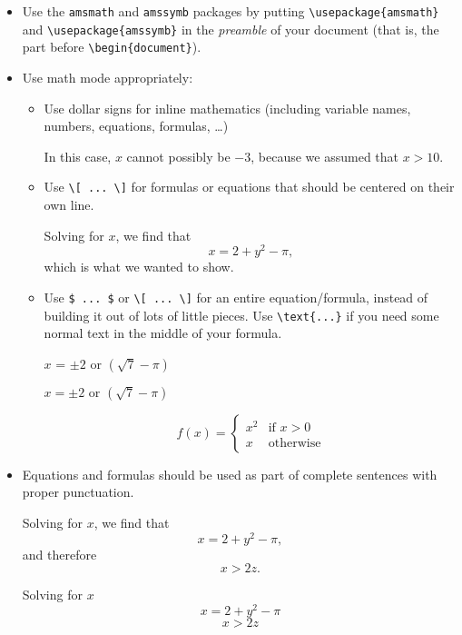 \documentclass{article}
\begin{document}
\begin{itemize}
\item Use the \texttt{amsmath} and \texttt{amssymb} packages by
  putting \verb|\usepackage{amsmath}| and \verb|\usepackage{amssymb}|
  in the \emph{preamble} of your document (that is, the part before
  \verb|\begin{document}|).
\item Use math mode appropriately:
  \begin{itemize}
  \item Use dollar signs for inline mathematics (including variable
    names, numbers, equations, formulas, \dots)
    \begin{good}
In this case, $x$ cannot possibly be $-3$, because we assumed that $x > 10$.
    \end{good}
  \item Use \verb|\[ ... \]| for formulas or equations that should be
    centered on their own line.
    \begin{good}
Solving for $x$, we find that \[ x = 2 + y^2 - \pi, \] which is what we wanted to show.
    \end{good}
 \item Use \verb|$ ... $| or \verb|\[ ... \]| for an entire
   equation/formula, instead of building it out of lots of little
   pieces. Use \verb|\text{...}| if you need some normal text in the
     middle of your formula.
   \begin{bad}
$x$ = $\pm 2$ or $(\sqrt{7} - \pi)$
   \end{bad}
   \begin{good}
$x = \pm 2 \text{ or } (\sqrt{7} - \pi)$
   \end{good}
   \begin{good}
\[ f(x) = \begin{cases} x^2 & \text{if } x > 0 \\ x & \text{otherwise} \end{cases} \]
   \end{good}
  \end{itemize}
\item Equations and formulas should be used as part of complete
  sentences with proper punctuation.
  \begin{good}
Solving for $x$, we find that \[ x = 2 + y^2 - \pi, \] and
therefore \[ x > 2z. \]
  \end{good}
  \begin{bad}
Solving for $x$ \[ x = 2 + y^2 - \pi \] \[ x > 2z \]
  \end{bad}

\end{itemize}
\end{document}
